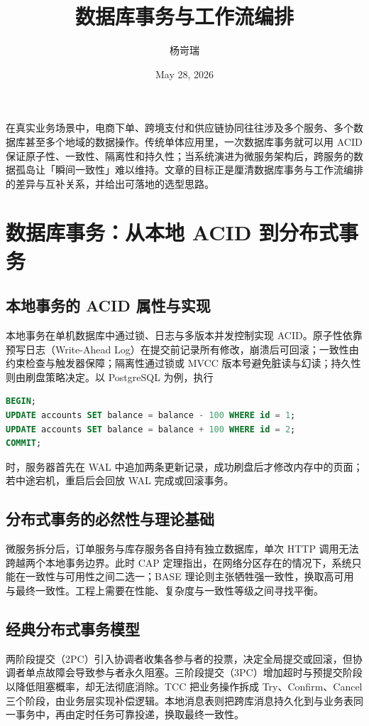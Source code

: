 \title{数据库事务与工作流编排}
\author{杨岢瑞}
\date{May 28, 2026}
\maketitle
在真实业务场景中，电商下单、跨境支付和供应链协同往往涉及多个服务、多个数据库甚至多个地域的数据操作。传统单体应用里，一次数据库事务就可以用 ACID 保证原子性、一致性、隔离性和持久性；当系统演进为微服务架构后，跨服务的数据孤岛让「瞬间一致性」难以维持。文章的目标正是厘清数据库事务与工作流编排的差异与互补关系，并给出可落地的选型思路。\par
\chapter{数据库事务：从本地 ACID 到分布式事务}
\section{本地事务的 ACID 属性与实现}
本地事务在单机数据库中通过锁、日志与多版本并发控制实现 ACID。原子性依靠预写日志（Write-Ahead Log）在提交前记录所有修改，崩溃后可回滚；一致性由约束检查与触发器保障；隔离性通过锁或 MVCC 版本号避免脏读与幻读；持久性则由刷盘策略决定。以 PostgreSQL 为例，执行\par
\begin{lstlisting}[language=sql]
BEGIN;
UPDATE accounts SET balance = balance - 100 WHERE id = 1;
UPDATE accounts SET balance = balance + 100 WHERE id = 2;
COMMIT;
\end{lstlisting}
时，服务器首先在 WAL 中追加两条更新记录，成功刷盘后才修改内存中的页面；若中途宕机，重启后会回放 WAL 完成或回滚事务。\par
\section{分布式事务的必然性与理论基础}
微服务拆分后，订单服务与库存服务各自持有独立数据库，单次 HTTP 调用无法跨越两个本地事务边界。此时 CAP 定理指出，在网络分区存在的情况下，系统只能在一致性与可用性之间二选一；BASE 理论则主张牺牲强一致性，换取高可用与最终一致性。工程上需要在性能、复杂度与一致性等级之间寻找平衡。\par
\section{经典分布式事务模型}
两阶段提交（2PC）引入协调者收集各参与者的投票，决定全局提交或回滚，但协调者单点故障会导致参与者永久阻塞。三阶段提交（3PC）增加超时与预提交阶段以降低阻塞概率，却无法彻底消除。TCC 把业务操作拆成 Try、Confirm、Cancel 三个阶段，由业务层实现补偿逻辑。本地消息表则把跨库消息持久化到与业务表同一事务中，再由定时任务可靠投递，换取最终一致性。\par
